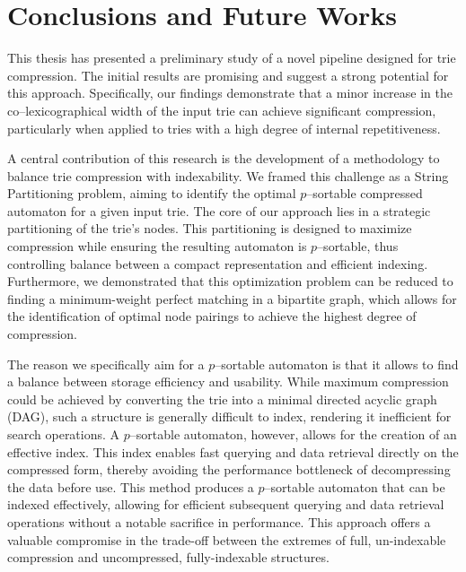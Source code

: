 \chapter{Conclusions and Future Works}
This thesis has presented a preliminary study of a novel pipeline designed for trie compression. The initial results are promising and suggest a strong potential for this approach. Specifically, our findings demonstrate that a minor increase in the co--lexicographical width of the input trie can achieve significant compression, particularly when applied to tries with a high degree of internal repetitiveness.

A central contribution of this research is the development of a methodology to balance trie compression with indexability. We framed this challenge as a String Partitioning problem, aiming to identify the optimal $p$--sortable compressed automaton for a given input trie. The core of our approach lies in a strategic partitioning of the trie's nodes. This partitioning is designed to maximize compression while ensuring the resulting automaton is $p$--sortable, thus controlling balance between a compact representation and efficient indexing. Furthermore, we demonstrated that this optimization problem can be reduced to finding a minimum-weight perfect matching in a bipartite graph, which allows for the identification of optimal node pairings to achieve the highest degree of compression.

The reason we specifically aim for a $p$--sortable automaton is that it allows to find a balance between storage efficiency and usability. While maximum compression could be achieved by converting the trie into a minimal directed acyclic graph (DAG), such a structure is generally difficult to index, rendering it inefficient for search operations. A $p$--sortable automaton, however, allows for the creation of an effective index. This index enables fast querying and data retrieval directly on the compressed form, thereby avoiding the performance bottleneck of decompressing the data before use. This method produces a $p$--sortable automaton that can be indexed effectively, allowing for efficient subsequent querying and data retrieval operations without a notable sacrifice in performance. This approach offers a valuable compromise in the trade-off between the extremes of full, un-indexable compression and uncompressed, fully-indexable structures.

